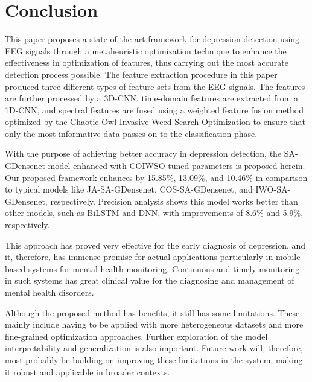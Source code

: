 \documentclass[conference]{IEEEtran}
\begin{document}
\section{Conclusion}

This paper proposes a state-of-the-art framework for depression detection using EEG signals through a metaheuristic optimization technique to enhance the effectiveness in optimization of features, thus carrying out the most accurate detection process possible. The feature extraction procedure in this paper produced three different types of feature sets from the EEG signals. The features are further processed by a 3D-CNN, time-domain features are extracted from a 1D-CNN, and spectral features are fused using a weighted feature fusion method optimized by the Chaotic Owl Invasive Weed Search Optimization to ensure that only the most informative data passes on to the classification phase.

With the purpose of achieving better accuracy in depression detection, the SA-GDensenet model enhanced with COIWSO-tuned parameters is proposed herein. Our proposed framework enhances by 15.85\%, 13.09\%, and 10.46\% in comparison to typical models like JA-SA-GDensenet, COS-SA-GDensenet, and IWO-SA-GDensenet, respectively. Precision analysis shows this model works better than other models, such as BiLSTM and DNN, with improvements of 8.6\% and 5.9\%, respectively.

This approach has proved very effective for the early diagnosis of depression, and it, therefore, has immense promise for actual applications particularly in mobile-based systems for mental health monitoring. Continuous and timely monitoring in such systems has great clinical value for the diagnosing and management of mental health disorders.

Although the proposed method has benefits, it still has some limitations. These mainly include having to be applied with more heterogeneous datasets and more fine-grained optimization approaches. Further exploration of the model interpretability and generalization is also important. Future work will, therefore, most probably be building on improving these limitations in the system, making it robust and applicable in broader contexts.
\end{document}
